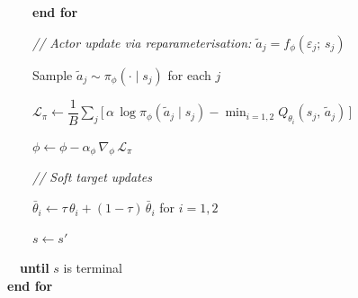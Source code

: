 \documentclass[11pt]{article}
\begin{document}
\begin{pseudobox}
\strut ~~~~\textbf{end for}\\
\strut ~~~~\emph{// Actor update via reparameterisation:
\(\tilde{a}_j = f_\phi(\varepsilon_j;\, s_j)\)}\\
\strut ~~~~Sample \(\tilde{a}_j \sim \pi_\phi(\cdot \mid s_j)\) for each
\(j\)\\
\strut ~~~~\(\mathcal{L}_\pi \leftarrow \dfrac{1}{B} \sum_j \bigl[\, \alpha\, \log \pi_\phi(\tilde{a}_j \mid s_j) - \min_{i = 1, 2} Q_{\theta_i}(s_j,\, \tilde{a}_j) \,\bigr]\)\\
\strut ~~~~\(\phi \leftarrow \phi - \alpha_\phi\, \nabla_{\phi}\, \mathcal{L}_\pi\)\\
\strut ~~~~\emph{// Soft target updates}\\
\strut ~~~~\(\bar{\theta}_i \leftarrow \tau\, \theta_i + (1 - \tau)\, \bar{\theta}_i\)
for \(i = 1, 2\)\\
\strut ~~~~\(s \leftarrow s'\)\\
\strut ~~\textbf{until} \(s\) is terminal\\
\textbf{end for}

\end{pseudobox}
\end{document}
